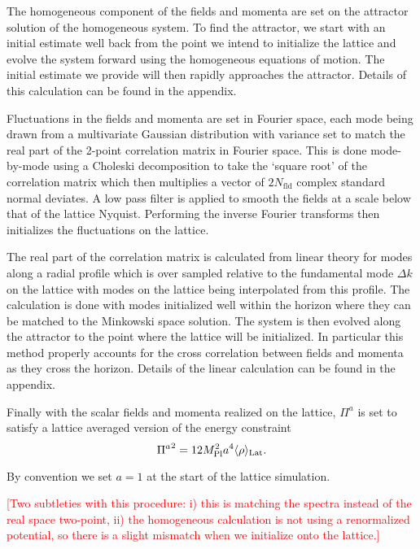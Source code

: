 The homogeneous component of the fields and momenta are set on the attractor solution of the homogeneous system. To find the attractor, we start with an initial estimate well back from the point we intend to initialize the lattice and evolve the system forward using the homogeneous equations of motion. The initial estimate we provide will then rapidly approaches the attractor. Details of this calculation can be found in the appendix. 

Fluctuations in the fields and momenta are set in Fourier space, each mode being drawn from a multivariate Gaussian distribution with variance set to match the real part of the 2-point correlation matrix in Fourier space. This is done mode-by-mode using a Choleski decomposition to take the `square root' of the correlation matrix which then multiplies a vector of $2N_\mathrm{fld}$ complex standard normal deviates. A low pass filter is applied to smooth the fields at a scale below that of the lattice Nyquist. Performing the inverse Fourier transforms then initializes the fluctuations on the lattice.

The real part of the correlation matrix is calculated from linear theory for modes along a radial profile which is over sampled relative to the fundamental mode $\Delta k$ on the lattice with modes on the lattice being interpolated from this profile. The calculation is done with modes initialized well within the horizon where they can be matched to the Minkowski space solution. The system is then evolved along the attractor to the point where the lattice will be initialized. In particular this method properly accounts for the cross correlation between fields and momenta as they cross the horizon. Details of the linear calculation can be found in the appendix.

Finally with the scalar fields and momenta realized on the lattice, $\Pi^a$ is set to satisfy a lattice averaged version of the energy constraint
\begin{equation} \label{eq:energy constraint}
  {\Pi^a}^2 = 12M_{\mathrm{Pl}}^2a^4\langle \rho \rangle_{\mathrm{Lat}}.
\end{equation}

By convention we set $a=1$ at the start of the lattice simulation.

\textcolor{red}{[Two subtleties with this procedure: i) this is matching the spectra instead of the real space two-point, ii) the homogeneous calculation is not using a renormalized potential, so there is a slight mismatch when we initialize onto the lattice.]}

